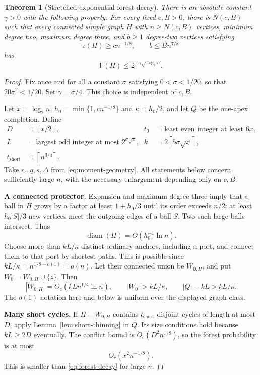 \documentclass[11pt,a4paper]{article}
\numberwithin{equation}{section}
\newtheorem{theorem}{Theorem}[section]
\theoremstyle{definition}
\theoremstyle{remark}
\newcommand{\Fav}{\mathsf F}
\newcommand{\proofstep}[1]{\par\addvspace{\medskipamount}\noindent\textbf{#1}\enspace\ignorespaces}
\newcommand{\ceil}[1]{\left\lceil#1\right\rceil}
\newcommand{\floor}[1]{\left\lfloor#1\right\rfloor}
\begin{document}
\begin{theorem}[Stretched-exponential forest decay]\label{thm:forest-decay}
There is an absolute constant $\gamma>0$ with the following property. For every fixed $c,B>0$, there is $N(c,B)$ such that every connected simple graph $H$ with $n\ge N(c,B)$ vertices, minimum degree two, maximum degree three, and $b\ge1$ degree-two vertices satisfying
\[
 \iota(H)\ge c n^{-1/8},\qquad b\le Bn^{7/8}
\]
has
\begin{equation}\label{eq:forest-decay}
 \Fav(H)\le2^{-\gamma\sqrt{\log_2n}}.
\end{equation}
\end{theorem}
\begin{proof}
Fix once and for all a constant $\sigma$ satisfying $0<\sigma<1/20$, so that $20\sigma^2<1/20$. Set $\gamma=\sigma/4$. This choice is independent of $c,B$.

Let $x=\log_2n$, $h_0=\min\{1,cn^{-1/8}\}$ and $\kappa=h_0/2$, and let $Q$ be the one-apex completion. Define
\begin{align}
 D&=\floor{x/2},& t_0&=\text{least even integer at least }6x,\nonumber\\
 L&=\text{largest odd integer at most }2^{\sigma\sqrt x},&
 k&=2\ceil{5\sigma\sqrt x},\label{eq:analytic-parameters}\\
 t_{\mathrm{short}}&=\ceil{n^{3/4}}.&&\nonumber
\end{align}
Take $r_c,q,s,\Delta$ from \eqref{eq:moment-geometry}. All statements below concern sufficiently large $n$, with the necessary enlargement depending only on $c,B$.

\proofstep{A connected protector.}
Expansion and maximum degree three imply that a ball in $H$ grows by a factor at least $1+h_0/3$ until its order exceeds $n/2$: at least $h_0|S|/3$ new vertices meet the outgoing edges of a ball $S$. Two such large balls intersect. Thus
\[
 \operatorname{diam}(H)=O(h_0^{-1}\ln n).
\]
Choose more than $kL/\kappa$ distinct ordinary anchors, including a port, and connect them to that port by shortest paths. This is possible since $kL/\kappa=n^{1/8+o(1)}=o(n)$. Let their connected union be $W_{0,H}$, and put $W_0=W_{0,H}\cup\{z\}$. Then
\[
 |W_{0,H}|=O_c(kL n^{1/4}\ln n),\qquad
 |W_0|>kL/\kappa,\qquad |Q|-kL>kL/\kappa.
\]
The $o(1)$ notation here and below is uniform over the displayed graph class.

\proofstep{Many short cycles.}
If $H-W_{0,H}$ contains $t_{\mathrm{short}}$ disjoint cycles of length at most $D$, apply Lemma~\ref{lem:short-thinning} in $Q$. Its size conditions hold because $kL\ge2D$ eventually. The conflict bound is $O_c(D^2 n^{1/8})$, so the forest probability is at most
\begin{equation}\label{eq:many-analytic}
 O_c(x^2n^{-1/8}).
\end{equation}
This is smaller than \eqref{eq:forest-decay} for large $n$.


\end{proof}
\end{document}
